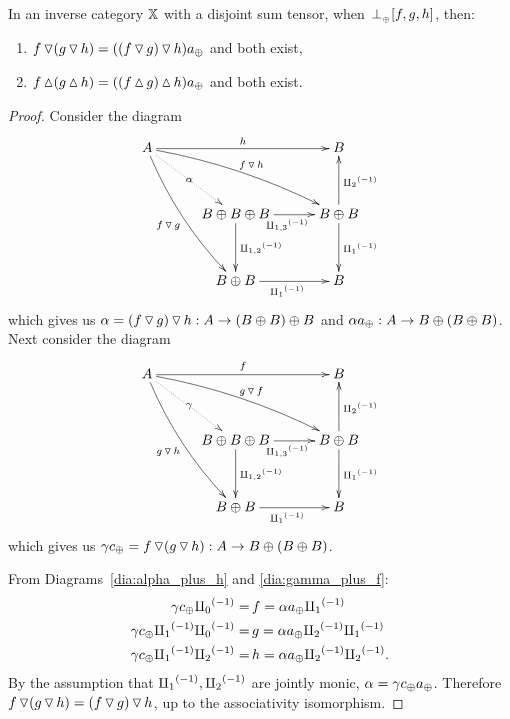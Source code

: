 \begin{lemma}\label{lem:tjdown_and_tjup_associate}
  In an inverse category $\mathbb{X}$ with a disjoint sum tensor, when ${}_{{}_{}}{\perp_{{}_{\oplus}}} [f,g,h]$, then:
  \begin{enumerate}[{(}i{)}]
    \item   $f \operatorname{\triangledown} (g \operatorname{\triangledown} h) = ((f \operatorname{\triangledown} g) \operatorname{\triangledown} h) a_{\oplus}$ and both exist,
    \item   $f \operatorname{\vartriangle} (g \operatorname{\vartriangle} h) = ((f \operatorname{\vartriangle} g) \operatorname{\vartriangle} h) a_{\oplus}$ and both exist.
  \end{enumerate}
\end{lemma}
\begin{proof}
  Consider the diagram
  \begin{equation}
    \xymatrix@C+5pt@R+10pt{
      A \ar@/_/[ddr]_{f\tjdown g} \ar@/^/[drr]^{f\tjdown h} \ar@{.>}[dr]|-{\alpha} \ar[rr]^{h}
        & & B \\
        & B\+B\+B \ar[d]^{\icp{1,2}} \ar[r]_{\icp{1,3}} & B\+B \ar[d]^{\icpa} \ar[u]_{\icpb} \\
        & B\+B \ar[r]_{\icpa} & B
    }\label{dia:alpha_plus_h}
  \end{equation}
  which gives us $\alpha = (f \operatorname{\triangledown} g) \operatorname{\triangledown} h: A \to (B\oplus B)\oplus B$ and
  $\alpha a_{\oplus} :A \to B\oplus(B\oplus B)$. Next consider the diagram
  \begin{equation}
    \xymatrix@C+5pt@R+10pt{
      A \ar@/_/[ddr]_{g\tjdown h} \ar@/^/[drr]^{g\tjdown f} \ar@{.>}[dr]|-{\gamma} \ar[rr]^{f}
        & & B \\
        & B\+B\+B \ar[d]^{\icp{1,2}} \ar[r]_{\icp{1,3}} & B\+B \ar[d]^{\icpa} \ar[u]_{\icpb} \\
        & B\+B \ar[r]_{\icpa} & B
    }\label{dia:gamma_plus_f}
  \end{equation}
  which gives us $\gamma c_{\oplus} = f \operatorname{\triangledown} (g\operatorname{\triangledown} h): A \to B\oplus(B\oplus B)$.

  From Diagrams~\ref{dia:alpha_plus_h} and \ref{dia:gamma_plus_f}:
  \begin{align*}
    \gamma c_{\oplus}  {\amalg_{0}}^{(-1)}         =\, &f  = \alpha a_{\oplus}{\amalg_{1}}^{(-1)}\\
    \gamma c_{\oplus}  {\amalg_{1}}^{(-1)} {\amalg_{0}}^{(-1)} =\, &g  = \alpha a_{\oplus}{\amalg_{2}}^{(-1)}{\amalg_{1}}^{(-1)}\\
    \gamma c_{\oplus}  {\amalg_{1}}^{(-1)} {\amalg_{2}}^{(-1)}   =\, & h = \alpha a_{\oplus}{\amalg_{2}}^{(-1)}{\amalg_{2}}^{(-1)}.
  \end{align*}
  By the assumption that ${\amalg_{1}}^{(-1)}, {\amalg_{2}}^{(-1)}$ are jointly monic,
  $\alpha = \gamma c_{\oplus}  a_{\oplus}$. Therefore $f \operatorname{\triangledown} (g \operatorname{\triangledown} h) = (f \operatorname{\triangledown} g) \operatorname{\triangledown} h$,
  up to the associativity isomorphism.
\end{proof}

